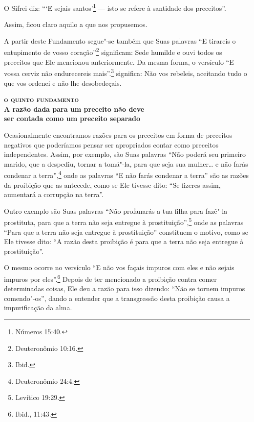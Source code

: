 O Sifrei\starr{} diz: ```E sejais santos'\footnote{Números 15:40.} --- isto se refere à
santidade dos preceitos''.

Assim, ficou claro aquilo a que nos propusemos.

A partir deste Fundamento segue"-se também que Suas palavras ``E tirareis
o entupimento de vosso coração''\footnote{Deuteronômio 10:16.} significam: Sede
humilde e ouvi todos os preceitos que Ele mencionou anteriormente. Da
mesma forma, o versículo ``E vossa cerviz não endurecereis mais''.\footnote{Ibid.} significa: Não vos rebeleis, aceitando tudo o que vos ordenei e
não lhe desobedeçais.


\bigskip

\noindent\textbf{\textsc{o quinto fundamento}\\A razão dada para um preceito não deve\\ ser contada como um preceito separado}

\smallskip

Ocasionalmente encontramos razões para os preceitos em forma de
preceitos negativos que poderíamos pensar ser apropriados contar como
preceitos independentes. Assim, por exemplo, são Suas palavras ``Não
poderá seu primeiro marido, que a despediu, tornar a tomá"-la, para que
seja sua mulher\ldots{} e não farás condenar a terra'',\footnote{Deuteronômio 24:4.}
onde as palavras ``E não farás condenar a terra'' são as razões da
proibição que as antecede, como se Ele tivesse dito: ``Se fizeres assim,
aumentará a corrupção na terra''.

Outro exemplo são Suas palavras ``Não profanarás a tua filha para
fazê"-la prostituta, para que a terra não seja entregue à prostituição'',\footnote{Levítico 19:29.} onde as palavras ``Para que a terra não seja entregue
à prostituição'' constituem o motivo, como se Ele tivesse dito: ``A
razão desta proibição é para que a terra não seja entregue à
prostituição''.

O mesmo ocorre no versículo ``E não vos façais impuros com eles e não
sejais impuros por eles''.\footnote{Ibid., 11:43.} Depois de ter mencionado a
proibição contra comer determinadas coisas, Ele deu a razão para isso
dizendo: ``Não se tornem impuros comendo"-os'', dando a entender que a
transgressão desta proibição causa a impurificação da alma.

